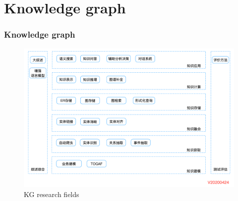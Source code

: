 \documentclass{beamer}
\begin{document}




\section{Knowledge graph}

\begin{frame}%
  \frametitle{Knowledge graph}
  \begin{figure}
    \centering
    \includegraphics[height=0.6\textwidth]{figure/kg0}
    \caption{KG research fields}
  \end{figure}
  

\end{frame}
\end{document}
